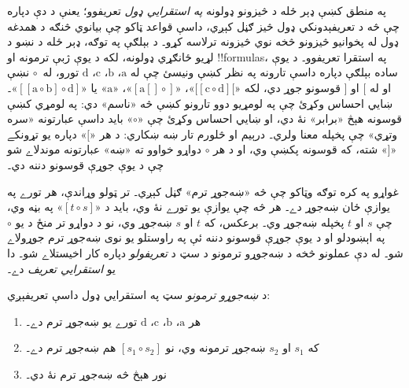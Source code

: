\documentclass[../../../include/open-logic-section]{subfiles}
\begin{document}


په منطق کښې ډېر ځله د څيزونو ډولونه \emph{په استقرايي ډول}
تعريفوو؛ يعنې د دې دپاره چې څه د تعريفېدونکي ډول څيز ګڼل
کېږي، داسې قواعد ټاکو چې بيانوي څنګه د همدغه ډول له پخوانيو
څيزونو څخه نوي څيزونه ترلاسه کړو۔ د بېلګې په توګه، ډېر
ځله د نښو د لړيو ځانګړي ډولونه، لکه د يوې ژبې ترمونه او
!!{formula}s، په استقرا تعريفوو۔ د يوې ساده بېلګې دپاره
داسې تارونه په نظر کښې ونيسئ چې له $\mathrm{a}$، $\mathrm{b}$،
$\mathrm{c}$، $\mathrm{d}$ تورو، له~$\circ$ نښې او له $[$ او
$]$ قوسونو جوړ دي، لکه «$[[\mathrm{c} \circ \mathrm{d}][$»،
«$[\mathrm{a}[]\circ]$»، «$\mathrm{a}$» يا
«$[[\mathrm{a} \circ \mathrm{b}]\circ
\mathrm{d}]$»۔ ښايي احساس وکړئ چې په لومړيو دوو تارونو
کښې څه «ناسم» دي: په لومړي کښې قوسونه هېڅ «برابر» نۀ
دي، او ښايي احساس وکړئ چې «$\circ$» بايد داسې عبارتونه
«سره وتړي» چې پخپله معنا ولري۔ درېيم او څلورم تار ښه
ښکاري: د هر «$[$» دپاره يو تړونکے «$]$» شته، که قوسونه
پکښې وي، او د هر $\circ$ دواړو خواوو ته «ښه» عبارتونه
موندلاے شو چې د يوې جوړې قوسونو دننه دي۔

غواړو په کره توګه وټاکو چې څه «ښه‌جوړ ترم» ګڼل کېږي۔
تر ټولو وړاندې، هر تورے په يوازې ځان ښه‌جوړ دے۔ هر څه
چې يوازې يو تورے نۀ وي، بايد د «$[t \circ s]$» په بڼه
وي، چې $s$ او $t$ پخپله ښه‌جوړ وي۔ برعکس، که $t$ او
$s$ ښه‌جوړ وي، نو د دواړو تر منځ د يو $\circ$ په
اېښودلو او د يوې جوړې قوسونو دننه ئې په راوستلو يو
نوی ښه‌جوړ ترم جوړولاے شو۔ له دې عملونو څخه د ښه‌جوړو
ترمونو د سټ د \emph{تعريفولو} دپاره کار اخيستلاے شو۔
دا يو \emph{استقرايي تعريف} دے۔

\begin{defn}
د \emph{ښه‌جوړو ترمونو} سټ په استقرايي ډول داسې تعريفېږي:
  \begin{enumerate}
  \item هر $\mathrm{a}$، $\mathrm{b}$، $\mathrm{c}$،
    $\mathrm{d}$ تورے يو ښه‌جوړ ترم دے۔
  \item که $s_1$ او $s_2$ ښه‌جوړ ترمونه وي، نو
    $[s_1 \circ s_2]$ هم ښه‌جوړ ترم دے۔
  \item نور هېڅ څه ښه‌جوړ ترم نۀ دي۔
  \end{enumerate}
\end{defn}
\end{document}
